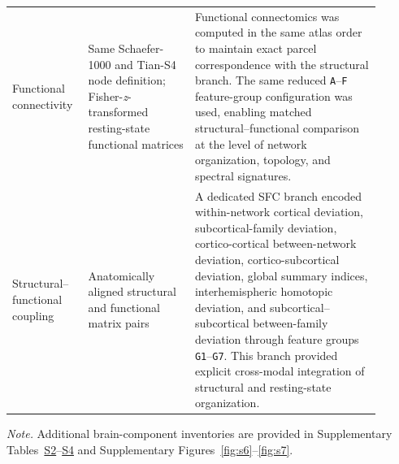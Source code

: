 \documentclass[11pt,a4paper,twoside]{article}
\begin{document}
\begin{longtable}{p{0.16\linewidth} p{0.27\linewidth} p{0.47\linewidth}}
Functional connectivity & Same Schaefer-1000 and Tian-S4 node definition; Fisher-\textit{z}-transformed resting-state functional matrices & Functional connectomics was computed in the same atlas order to maintain exact parcel correspondence with the structural branch. The same reduced \texttt{A}--\texttt{F} feature-group configuration was used, enabling matched structural--functional comparison at the level of network organization, topology, and spectral signatures. \\
Structural--functional coupling & Anatomically aligned structural and functional matrix pairs & A dedicated SFC branch encoded within-network cortical deviation, subcortical-family deviation, cortico-cortical between-network deviation, cortico-subcortical deviation, global summary indices, interhemispheric homotopic deviation, and subcortical--subcortical between-family deviation through feature groups \texttt{G1}--\texttt{G7}. This branch provided explicit cross-modal integration of structural and resting-state organization. \\
\end{longtable}
\par\smallskip\noindent\small\textit{Note.} Additional brain-component inventories are provided in Supplementary Tables~\hyperref[tab:s2]{S2}--\hyperref[tab:s4]{S4} and Supplementary Figures~\ref{fig:s6}--\ref{fig:s7}.
\endgroup
\end{document}
